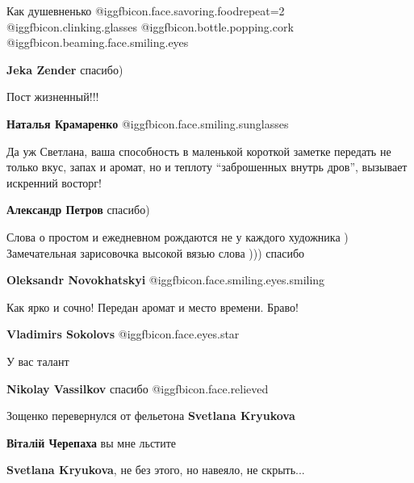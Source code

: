  
 
 
 
 
\zzSecCmt

\begin{itemize} %
Как душевненько @igg{fbicon.face.savoring.food}{repeat=2}  @igg{fbicon.clinking.glasses}  @igg{fbicon.bottle.popping.cork}  @igg{fbicon.beaming.face.smiling.eyes} 


\textbf{Jeka Zender} спасибо)

Пост жизненный!!!


\textbf{Наталья Крамаренко}  @igg{fbicon.face.smiling.sunglasses} 


Да уж Светлана, ваша способность в маленькой короткой заметке передать не
только вкус, запах и аромат, но и теплоту \enquote{заброшенных внутрь дров}, вызывает
искренний восторг!

\textbf{Александр Петров} спасибо)


Слова о простом и ежедневном рождаются не у каждого художника )
Замечательная зарисовочка высокой вязью слова ))) спасибо

\textbf{Oleksandr Novokhatskyi}  @igg{fbicon.face.smiling.eyes.smiling} 

Как ярко и сочно! Передан аромат и место времени. Браво!


\textbf{Vladimirs Sokolovs}  @igg{fbicon.face.eyes.star} 

У вас талант


\textbf{Nikolay Vassilkov} спасибо  @igg{fbicon.face.relieved} 

Зощенко перевернулся от фельетона \textbf{Svetlana Kryukova}

\textbf{Віталій Черепаха} вы мне льстите

\textbf{Svetlana Kryukova}, не без этого, но навеяло, не скрыть...


\end{itemize}
